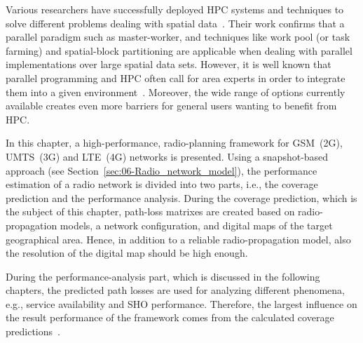 Various researchers have successfully deployed HPC systems and techniques
to solve different problems dealing with spatial data~\cite{Akhter_Porting_GRASS_raster_module_to_distributed_computing:2007,Armstrong_Using_a_computational_grid_for_geographic_information_analysis:2005,Guan_A_parallel_computing_approach_to_fast_geostatistical_areal_interpolation:2011,Huang_Using_adaptively_coupled_models_and_high_performance_computing_for_enabling_the_computability_of_dust_storm_forecasting:2012,Li_Parallel_cellular_automata_for_large_scale_urban_simulation_using_load_balancing_techniques:2010,Osterman_CUDA_on_GRASS:2012,Tabik-High_performance_three_horizon_composition_algorithm_for_large_scale_terrains:2011,Tabik-Optimal_tilt_and_orientation_maps_a_multi_algorithm_approach_for_heterogeneous_multicore_GPU_systems:2013,Tabik_Simultaneous_computation_of_total_viewshed_on_large_high_resolution_grids:2012,Widener_Developing_a_parallel_computational_implementation_of_AMOEBA:2012,Yin_A_framework_for_integrating_GIS_and_parallel_computing_for_spatial_control_problems_a_case_study_of_wildfire_dontrol:2012}.
Their work confirms that a parallel paradigm such as master-worker,
and techniques like work pool (or task farming) and spatial-block
partitioning are applicable when dealing with parallel implementations
over large spatial data sets. However, it is well known that parallel
programming and HPC often call for area experts in order to integrate
them into a given environment~\cite{Clematis_High_performance_computing_with_geographical_data:2003}.
Moreover, the wide range of options currently available creates even
more barriers for general users wanting to benefit from HPC.

\bigskip{}


In this chapter, a high-performance, radio-planning framework for
GSM~(2G), UMTS~(3G) and LTE~(4G) networks is presented. Using a
snapshot-based approach (see Section~\ref{sec:06-Radio_network_model}),
the performance estimation of a radio network is divided into two
parts, i.e., the coverage prediction and the performance analysis.
During the coverage prediction, which is the subject of this chapter,
path-loss matrixes are created based on radio-propagation models,
a network configuration, and digital maps of the target geographical
area. Hence, in addition to a reliable radio-propagation model, also
the resolution of the digital map should be high enough.

During the performance-analysis part, which is discussed in the following
chapters, the predicted path losses are used for analyzing different
phenomena, e.g., service availability and SHO performance. Therefore,
the largest influence on the result performance of the framework comes
from the calculated coverage predictions~\cite{Coinchon-The_impact_of_radio_propagation_predictions:2020}.

